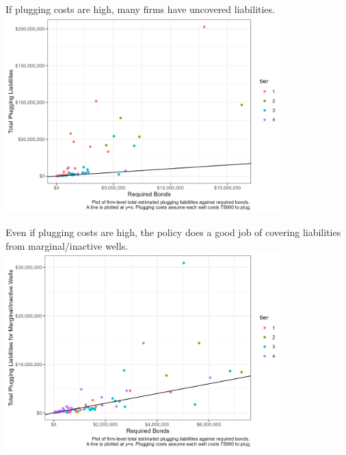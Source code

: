 \documentclass{beamer}
\begin{document}
\begin{frame}{If plugging costs are high, many firms have uncovered liabilities.}
\label{Fig2}
\vspace{-0.5cm}
\centering
\includegraphics[width=0.8\textwidth]{Figures/BondsLiabilities2.jpg}

\hyperlink{Liability2Zoom}{}
    
\end{frame}

\begin{frame}{Even if plugging costs are high, the policy does a good job of covering liabilities from marginal/inactive wells.}
\label{Fig2Marginal}
\vspace{-0.5cm}
    \includegraphics[width=0.8\textwidth]{Figures/InactiveMarginalLiabilities2.jpg}\\
    \hyperlink{Tier4Liability2}{}

    
\end{frame}
\end{document}
